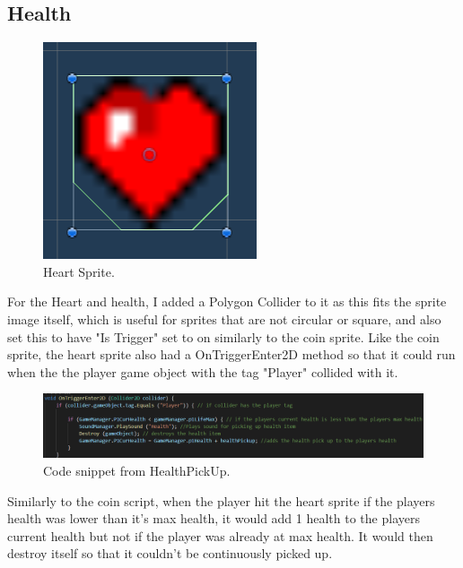 \subsection{Health}
\begin{figure}[h]
\centering
  \includegraphics[width= 0.2\linewidth]{Images/Heart.PNG}
  \caption{Heart Sprite.}
  \label{fig:Heart}
\end{figure}
For the Heart and health, I added a Polygon Collider to it as this fits the sprite image itself, which is useful for sprites that are not circular or square, and also set this to have "Is Trigger" set to on similarly to the coin sprite. Like the coin sprite, the heart sprite also had a OnTriggerEnter2D method so that it could run when the the player game object with the tag "Player" collided with it.
\begin{figure}[h]
\centering
  \includegraphics[width= 1\linewidth]{Images/HealthTrigger.PNG}
  \caption{Code snippet from HealthPickUp.}
  \label{fig:Health}
\end{figure}
\newline
Similarly to the coin script, when the player hit the heart sprite if the players health was lower than it's max health, it would add 1 health to the players current health but not if the player was already at max health. It would then destroy itself so that it couldn't be continuously picked up.


